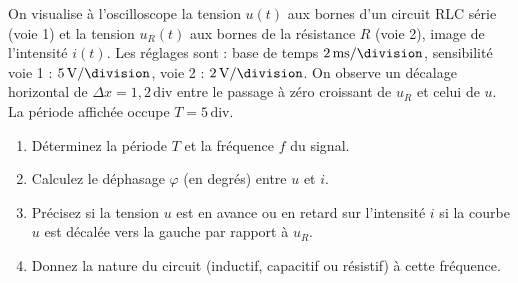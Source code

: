 \documentclass[11pt]{article}
\begin{document}
\begin{exercice}
On visualise à l'oscilloscope la tension $u(t)$ aux bornes d'un circuit RLC série (voie 1) et la tension $u_R(t)$ aux bornes de la résistance $R$ (voie 2), image de l'intensité $i(t)$. Les réglages sont : base de temps $\SI{2}{\milli\second\per\division}$, sensibilité voie 1 : $\SI{5}{\volt\per\division}$, voie 2 : $\SI{2}{\volt\per\division}$. On observe un décalage horizontal de $\Delta x = 1,2\,\text{div}$ entre le passage à zéro croissant de $u_R$ et celui de $u$. La période affichée occupe $T = 5\,\text{div}$.
\begin{enumerate}
    \item Déterminez la période $T$ et la fréquence $f$ du signal.
    \item Calculez le déphasage $\varphi$ (en degrés) entre $u$ et $i$.
    \item Précisez si la tension $u$ est en avance ou en retard sur l'intensité $i$ si la courbe $u$ est décalée vers la gauche par rapport à $u_R$.
    \item Donnez la nature du circuit (inductif, capacitif ou résistif) à cette fréquence.
\end{enumerate}
\end{exercice}
\end{document}

